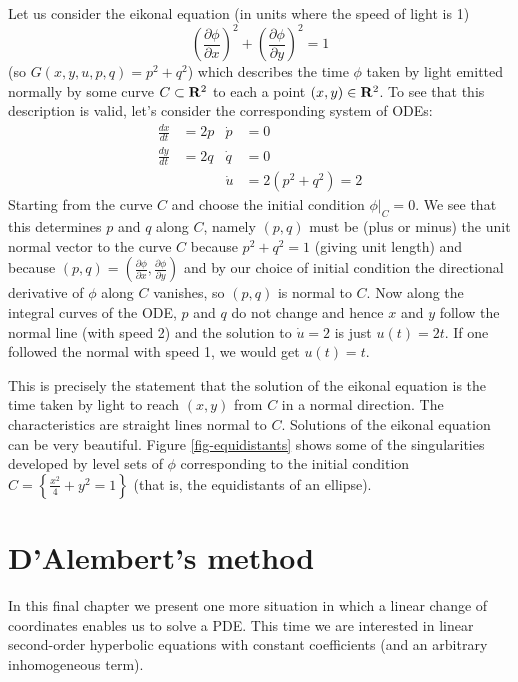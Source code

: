 \begin{leftbar}
\begin{exm}
Let us consider the eikonal equation (in units where the speed of light is 1)
\[\left(\frac{\partial\phi}{\partial x}\right)^2+\left(\frac{\partial\phi}{\partial y}\right)^2=1\]
(so $G(x,y,u,p,q)=p^2+q^2$) which describes the time $\phi$ taken by light emitted normally by some curve $C\subset\mathbf{R}^2$ to each a point $(x,y)\in\mathbf{R}^2$. To see that this description is valid, let's consider the corresponding system of ODEs:
\begin{align*}
\frac{dx}{dt}&=2p&\dot{p}&=0\\
\frac{dy}{dt}&=2q&\dot{q}&=0\\
&&\dot{u}&=2(p^2+q^2)=2
\end{align*}
Starting from the curve $C$ and choose the initial condition $\phi|_C=0$. We see that this determines $p$ and $q$ along $C$, namely $(p,q)$ must be (plus or minus) the unit normal vector to the curve $C$ because $p^2+q^2=1$ (giving unit length) and because $(p,q)=\left(\tfrac{\partial\phi}{\partial x},\tfrac{\partial\phi}{\partial y}\right)$ and by our choice of initial condition the directional derivative of $\phi$ along $C$ vanishes, so $(p,q)$ is normal to $C$. Now along the integral curves of the ODE, $p$ and $q$ do not change and hence $x$ and $y$ follow the normal line (with speed 2) and the solution to $\dot{u}=2$ is just $u(t)=2t$. If one followed the normal with speed 1, we would get $u(t)=t$.

This is precisely the statement that the solution of the eikonal equation is the time taken by light to reach $(x,y)$ from $C$ in a normal direction. The characteristics are straight lines normal to $C$. Solutions of the eikonal equation can be very beautiful. Figure \ref{fig-equidistants} shows some of the singularities developed by level sets of $\phi$ corresponding to the initial condition $C=\left\{\frac{x^2}{4}+y^2=1\right\}$ (that is, the equidistants of an ellipse).
\end{exm}
\end{leftbar}


\chapter{D'Alembert's method}

In this final chapter we present one more situation in which a linear change of coordinates enables us to solve a PDE. This time we are interested in linear second-order hyperbolic equations with constant coefficients (and an arbitrary inhomogeneous term).

